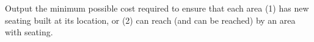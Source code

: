 Output the minimum possible cost required to ensure that each area (1) has new seating built at its location, or (2) can reach (and can be reached) by an area with seating.